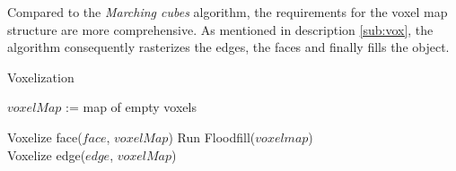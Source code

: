 Compared to the \emph{Marching cubes} algorithm, the requirements for the voxel map structure
are more comprehensive. As mentioned in description \ref{sub:vox}, the algorithm consequently rasterizes
the edges, the faces and finally fills the object.

\begin{algorithm}[H]
\caption{Voxelization}
\label{alg:vox}
\begin{algorithmic}[1]
			\State $voxelMap$ := map of empty voxels

			\State Voxelize face($face$, $voxelMap$)
		\EndFor
		\State Run Floodfill($voxel map$)
		\State {}
	\EndFunction
	\\
			\State Voxelize edge($edge$, $voxelMap$)
		\EndFor
		\State {}
	\EndFunction
	\\
	\EndFunction
\end{algorithmic}
\end{algorithm}